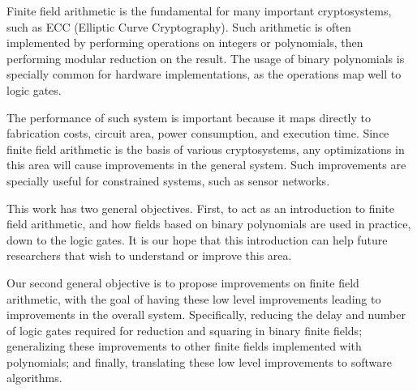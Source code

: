 

Finite field arithmetic is the fundamental for many important cryptosystems, such as ECC (Elliptic Curve Cryptography). Such arithmetic is often implemented by performing operations on integers or polynomials, then performing modular reduction on the result. The usage of binary polynomials is specially common for hardware implementations, as the operations map well to logic gates.

The performance of such system is important because it maps directly to fabrication costs, circuit area, power consumption, and execution time. Since finite field arithmetic is the basis of various cryptosystems, any optimizations in this area will cause improvements in the general system. Such improvements are specially useful for constrained systems, such as sensor networks.

This work has two general objectives. First, to act as an introduction to finite field arithmetic, and how fields based on binary polynomials are used in practice, down to the logic gates. It is our hope that this introduction can help future researchers that wish to understand or improve this area.

Our second general objective is to propose improvements on finite field arithmetic, with the goal of having these low level improvements leading to improvements in the overall system. Specifically, reducing the delay and number of logic gates required for reduction and squaring in binary finite fields; generalizing these improvements to other finite fields implemented with polynomials; and finally, translating these low level improvements to software algorithms.

